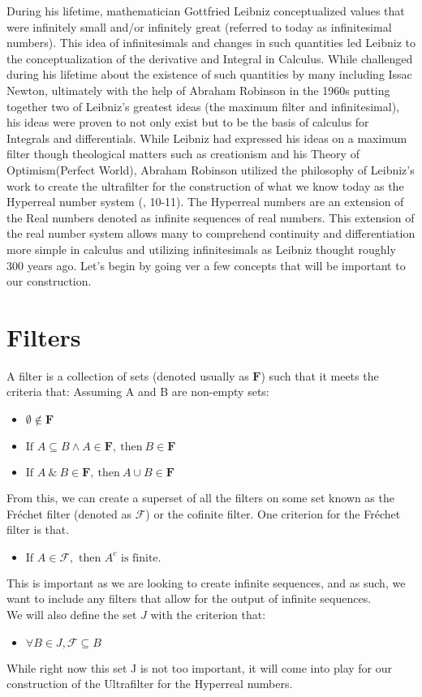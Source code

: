 \documentclass[12pt]{report}
\begin{document}
During his lifetime, mathematician Gottfried Leibniz conceptualized values that were infinitely small and/or infinitely great (referred to today as infinitesimal numbers).
This idea of infinitesimals and changes in such quantities led Leibniz to the conceptualization of the derivative and Integral in Calculus. 
While challenged during his lifetime about the existence of such quantities by many including Issac Newton, ultimately with the help of Abraham Robinson in the 1960s putting together two of Leibniz's greatest ideas (the maximum filter and infinitesimal), his ideas were proven to not only exist but to be the basis of calculus for Integrals and differentials. 
While Leibniz had expressed his ideas on a maximum filter though theological matters such as creationism and his Theory of Optimism(Perfect World), Abraham Robinson utilized the philosophy of Leibniz's work to create the ultrafilter for the construction of what we know today as the Hyperreal number system (\citeauthor{Goldblatt}, 10-11).
The Hyperreal numbers are an extension of the Real numbers denoted as infinite sequences of real numbers. 
This extension of the real number system allows many to comprehend continuity and differentiation more simple in calculus and utilizing infinitesimals as Leibniz thought  roughly 300 years ago.
Let's begin by going ver a few concepts that will be important to our construction.

\section*{Filters}
A filter is a collection of sets (denoted usually as $\mathbf{F}$) such that it meets the criteria that:
Assuming A and B are non-empty sets:
\begin{itemize}
    \item $\emptyset \not\in \mathbf{F}$
    \item $\text{If }  A \subseteq B \land A  \in \mathbf{F} ,\ \text{then} \ B \in \mathbf{F} $
    \item $\text{If }  A \ \& \ B  \in \mathbf{F} ,\ \text{then}  \ A \cup B \in \mathbf{F} $
\end{itemize}
From this, we can create a superset of all the filters on some set known as the Fr\'echet filter (denoted as $\mathcal{F}$) or the cofinite filter.
One criterion for the Fr\'echet filter is that.
\begin{itemize}
    \item $\text{If } A \in \mathcal{F}, \text{ then } A^c \text{ is finite.}$
\end{itemize}
This is important as we are looking to create infinite sequences, and as such, we want to include any filters that allow for the output of infinite sequences.\\
We will also define the set $J$ with the criterion that:
\begin{itemize}
    \item $\forall B \in J, \mathcal{F} \subseteq B$
\end{itemize}
While right now this set J is not too important, it will come into play for our construction of the Ultrafilter for the Hyperreal numbers.
\end{document}
